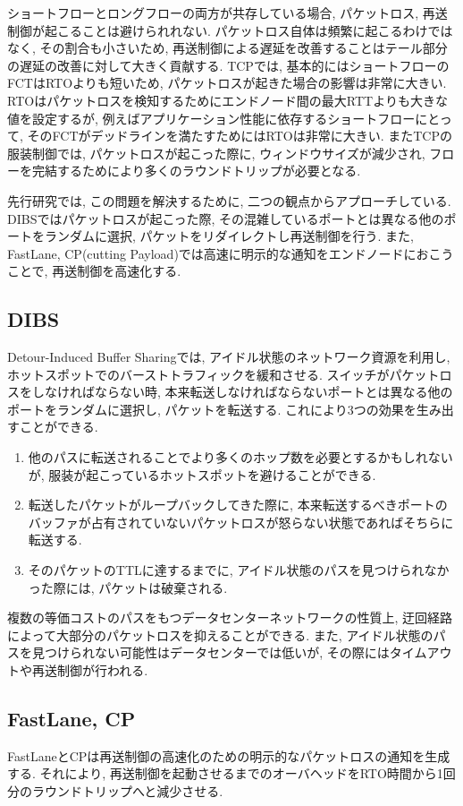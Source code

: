 ショートフローとロングフローの両方が共存している場合, パケットロス, 再送制御が起こることは避けられれない. 
パケットロス自体は頻繁に起こるわけではなく, その割合も小さいため, 再送制御による遅延を改善することはテール部分の遅延の改善に対して大きく貢献する. 
TCPでは, 基本的にはショートフローのFCTはRTOよりも短いため, パケットロスが起きた場合の影響は非常に大きい. 
RTOはパケットロスを検知するためにエンドノード間の最大RTTよりも大きな値を設定するが,
例えばアプリケーション性能に依存するショートフローにとって, そのFCTがデッドラインを満たすためにはRTOは非常に大きい. 
またTCPの服装制御では, パケットロスが起こった際に, ウィンドウサイズが減少され, フローを完結するためにより多くのラウンドトリップが必要となる. 

先行研究では, この問題を解決するために, 二つの観点からアプローチしている. 
DIBS\cite{DOBS}ではパケットロスが起こった際, その混雑しているポートとは異なる他のポートをランダムに選択,
パケットをリダイレクトし再送制御を行う. 
また, FastLane\cite{fastlane}, CP(cutting
Payload)\cite{cp}では高速に明示的な通知をエンドノードにおこうことで, 再送制御を高速化する. 

\subsection{DIBS}
Detour-Induced Buffer Sharing\cite{DIBS}では, アイドル状態のネットワーク資源を利用し,
ホットスポットでのバーストトラフィックを緩和させる. 
スイッチがパケットロスをしなければならない時, 本来転送しなければならないポートとは異なる他のポートをランダムに選択し, パケットを転送する. 
これにより3つの効果を生み出すことができる. 
\begin{enumerate}
\item 他のパスに転送されることでより多くのホップ数を必要とするかもしれないが, 服装が起こっているホットスポットを避けることができる. 
\item 転送したパケットがループバックしてきた際に, 本来転送するべきポートのバッファが占有されていないパケットロスが怒らない状態であればそちらに転送する. 
\item そのパケットのTTLに達するまでに, アイドル状態のパスを見つけられなかった際には, パケットは破棄される. 
\end{enumerate}
複数の等価コストのパスをもつデータセンターネットワークの性質上, 迂回経路によって大部分のパケットロスを抑えることができる. 
また, アイドル状態のパスを見つけられない可能性はデータセンターでは低いが, その際にはタイムアウトや再送制御が行われる. 

\subsection{FastLane, CP}
FastLane\cite{fastlane}とCP\cite{cp}は再送制御の高速化のための明示的なパケットロスの通知を生成する. 
それにより, 再送制御を起動させるまでのオーバヘッドをRTO時間から1回分のラウンドトリップへと減少させる. 

